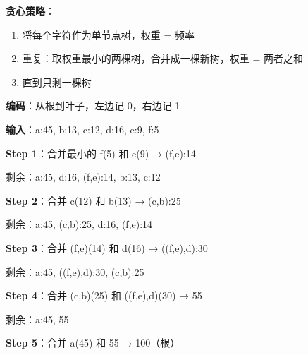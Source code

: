 \documentclass[12pt, a4paper]{ctexart}
\begin{document}
\begin{blackboard}[霍夫曼算法]

\textbf{贪心策略}：
\begin{enumerate}
    \item 将每个字符作为单节点树，权重 = 频率
    \item 重复：取权重最小的两棵树，合并成一棵新树，权重 = 两者之和
    \item 直到只剩一棵树
\end{enumerate}

\textbf{编码}：从根到叶子，左边记 0，右边记 1

\end{blackboard}

\begin{blackboard}[霍夫曼编码手算]

\textbf{输入}：a:45, b:13, c:12, d:16, e:9, f:5

\textbf{Step 1}：合并最小的 f(5) 和 e(9) → (f,e):14

剩余：a:45, d:16, (f,e):14, b:13, c:12

\textbf{Step 2}：合并 c(12) 和 b(13) → (c,b):25

剩余：a:45, (c,b):25, d:16, (f,e):14

\textbf{Step 3}：合并 (f,e)(14) 和 d(16) → ((f,e),d):30

剩余：a:45, ((f,e),d):30, (c,b):25

\textbf{Step 4}：合并 (c,b)(25) 和 ((f,e),d)(30) → 55

剩余：a:45, 55

\textbf{Step 5}：合并 a(45) 和 55 → 100（根）

\end{blackboard}
\end{document}
